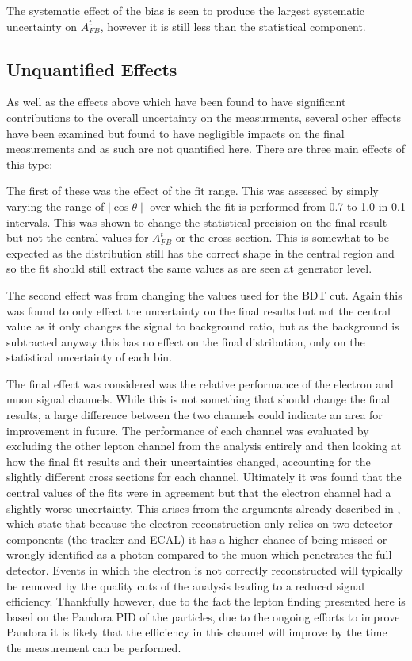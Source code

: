 The systematic effect of the bias is seen to produce the largest systematic uncertainty on $A_{FB}^t$, however it is still less than the statistical component.

\subsection{Unquantified Effects}

As well as the effects above which have been found to have significant contributions to the overall uncertainty on the measurments, several other effects have been examined but found to have negligible impacts on the final measurements and as such are not quantified here. There are three main effects of this type:

The first of these was the effect of the fit range. This was assessed by simply varying the range of $\mid\cos\theta\mid$ over which the fit is performed from 0.7 to 1.0 in 0.1 intervals. This was shown to change the statistical precision on the final result but not the central values for $A_{FB}^t$ or the cross section. This is somewhat to be expected as the distribution still has the correct shape in the central region and so the fit should still extract the same values as are seen at generator level.

The second effect was from changing the values used for the \ac{BDT} cut. Again this was found to only effect the uncertainty on the final results but not the central value as it only changes the signal to background ratio, but as the background is subtracted anyway this has no effect on the final distribution, only on the statistical uncertainty of each bin.

The final effect was considered was the relative performance of the electron and muon signal channels. While this is not something that should change the final results, a large difference between the two channels could indicate an area for improvement in future. The performance of each channel was evaluated by excluding the other lepton channel from the analysis entirely and then looking at how the final fit results and their uncertainties changed, accounting for the slightly different cross sections for each channel. Ultimately it was found that the central values of the fits were in agreement but that the electron channel had a slightly worse uncertainty. This arises frrom the arguments already described in , which state that because the electron reconstruction only relies on two detector components (the tracker and \ac{ECAL}) it has a higher chance of being missed or wrongly identified as a photon compared to the muon which penetrates the full detector. Events in which the electron is not correctly reconstructed will typically be removed by the quality cuts of the analysis leading to a reduced signal efficiency. Thankfully however, due to the fact the lepton finding presented here is based on the Pandora \ac{PID} of the particles, due to the ongoing efforts to improve Pandora it is likely that the efficiency in this channel will improve by the time the measurement can be performed. 


